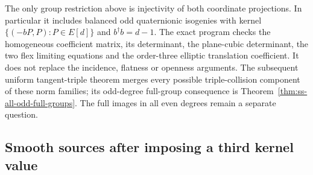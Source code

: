 \begin{remark}\label{auto:A_monodromy:abc2304989b0}

The only group restriction above is injectivity of both coordinate
projections. In particular it includes balanced odd quaternionic
isogenies with kernel $\{(-bP,P):P\in E[d]\}$ and
$b^\dagger b=d-1$. The exact program
checks the homogeneous coefficient matrix, its determinant, the
plane-cubic determinant, the two flex limiting equations and the
order-three elliptic translation coefficient. It does not replace
the incidence, flatness or openness arguments. The subsequent uniform
tangent-triple theorem merges every possible triple-collision component
of these norm families; its odd-degree full-group consequence is
Theorem~\ref{thm:ss-all-odd-full-groups}. The full images in all even
degrees remain a separate question.
\end{remark}


\subsection{Smooth sources after imposing a third kernel value}
\label{sec:DE-A4-contact-third-value}


